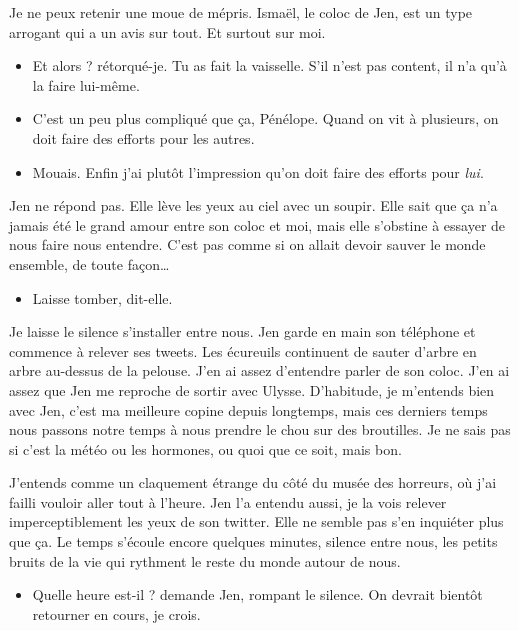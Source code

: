 Je ne peux retenir une moue de mépris. Ismaël, le coloc de Jen, est un type arrogant qui a un avis sur tout. Et surtout sur moi.

\begin{itemize}
\item Et alors ? rétorqué-je. Tu as fait la vaisselle. S'il n'est pas content, il n'a qu'à la faire lui-même.
\item C'est un peu plus compliqué que ça, Pénélope. Quand on vit à plusieurs, on doit faire des efforts pour les autres.
\item Mouais. Enfin j'ai plutôt l'impression qu'on doit faire des efforts pour \textit{lui}.
\end{itemize}

Jen ne répond pas. Elle lève les yeux au ciel avec un soupir. Elle sait que ça n'a jamais été le grand amour entre son coloc et moi, mais elle s'obstine à essayer de nous faire nous entendre. C'est pas comme si on allait devoir sauver le monde ensemble, de toute façon…

\begin{itemize}
\item Laisse tomber, dit-elle.
\end{itemize}

Je laisse le silence s'installer entre nous. Jen garde en main son téléphone et commence à relever ses tweets. Les écureuils continuent de sauter d'arbre en arbre au-dessus de la pelouse. J'en ai assez d'entendre parler de son coloc. J'en ai assez que Jen me reproche de sortir avec Ulysse. D'habitude, je m'entends bien avec Jen, c'est ma meilleure copine depuis longtemps, mais ces derniers temps nous passons notre temps à nous prendre le chou sur des broutilles. Je ne sais pas si c'est la météo ou les hormones, ou quoi que ce soit, mais bon.

J'entends comme un claquement étrange du côté du musée des horreurs, où j'ai failli vouloir aller tout à l'heure. Jen l'a entendu aussi, je la vois relever imperceptiblement les yeux de son twitter. Elle ne semble pas s'en inquiéter plus que ça. Le temps s'écoule encore quelques minutes, silence entre nous, les petits bruits de la vie qui rythment le reste du monde autour de nous.

\begin{itemize}
\item Quelle heure est-il ? demande Jen, rompant le silence. On devrait bientôt retourner en cours, je crois.
\end{itemize}


